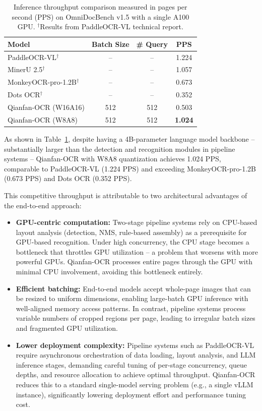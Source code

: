 \documentclass[dvipsnames]{article}
\begin{document}
\begin{table}[H]
\centering
\small
\setlength{\tabcolsep}{6pt}
\begin{tabular}{l|ccc}
\toprule
\textbf{Model} & \textbf{Batch Size} & \textbf{\# Query} & \textbf{PPS} \\
\midrule
PaddleOCR-VL$^\dagger$ & -- & -- & 1.224 \\
MinerU 2.5$^\dagger$ & -- & -- & 1.057 \\
MonkeyOCR-pro-1.2B$^\dagger$ & -- & -- & 0.673 \\
Dots OCR$^\dagger$ & -- & -- & 0.352 \\
\midrule
Qianfan-OCR (W16A16) & 512 & 512 & 0.503 \\
Qianfan-OCR (W8A8) & 512 & 512 & \textbf{1.024} \\
\bottomrule
\end{tabular}
\caption{Inference throughput comparison measured in pages per second (PPS) on OmniDocBench v1.5 with a single A100 GPU. $^\dagger$Results from PaddleOCR-VL technical report.}
\label{tab:throughput}
\end{table}

As shown in Table~\ref{tab:throughput}, despite having a 4B-parameter language model backbone -- substantially larger than the detection and recognition modules in pipeline systems -- Qianfan-OCR with W8A8 quantization achieves 1.024 PPS, comparable to PaddleOCR-VL (1.224 PPS) and exceeding MonkeyOCR-pro-1.2B (0.673 PPS) and Dots OCR (0.352 PPS).

This competitive throughput is attributable to two architectural advantages of the end-to-end approach:

\begin{itemize}[noitemsep,topsep=0pt]
\item \textbf{GPU-centric computation:} Two-stage pipeline systems rely on CPU-based layout analysis (detection, NMS, rule-based assembly) as a prerequisite for GPU-based recognition. Under high concurrency, the CPU stage becomes a bottleneck that throttles GPU utilization -- a problem that worsens with more powerful GPUs. Qianfan-OCR processes entire pages through the GPU with minimal CPU involvement, avoiding this bottleneck entirely.
\item \textbf{Efficient batching:} End-to-end models accept whole-page images that can be resized to uniform dimensions, enabling large-batch GPU inference with well-aligned memory access patterns. In contrast, pipeline systems process variable numbers of cropped regions per page, leading to irregular batch sizes and fragmented GPU utilization.
\item \textbf{Lower deployment complexity:} Pipeline systems such as PaddleOCR-VL require asynchronous orchestration of data loading, layout analysis, and LLM inference stages, demanding careful tuning of per-stage concurrency, queue depths, and resource allocation to achieve optimal throughput. Qianfan-OCR reduces this to a standard single-model serving problem (e.g., a single vLLM instance), significantly lowering deployment effort and performance tuning cost.
\end{itemize}
\end{document}
